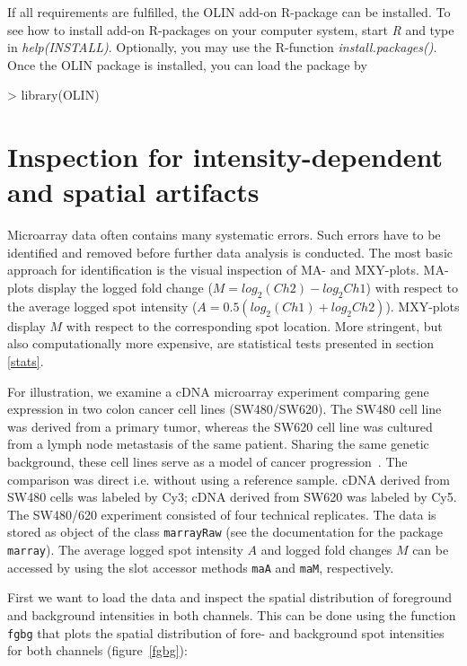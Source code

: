 \documentclass[a4paper,11pt]{article}
\begin{document}
If all requirements are fulfilled, the OLIN add-on R-package can be installed. To see how to install add-on R-packages on your computer system, start \textit{R} and type in \textit{help(INSTALL)}.
Optionally, you may use the R-function \textit{install.packages()}. 
Once the OLIN package is installed, you can load the package by 

\begin{Schunk}
\begin{Sinput}
> library(OLIN)
\end{Sinput}
\end{Schunk}



\section{Inspection for  intensity-dependent and spatial artifacts}
\label{visu}
Microarray data often contains many systematic errors.
 Such errors have to be identified and removed
 before further data analysis is conducted.  The most basic approach for identification 
 is the visual inspection 
of MA- and MXY-plots. MA-plots display the logged fold change 
($M=log_{2}(Ch2) - log_{2}{Ch1}$)
with respect to the average logged spot intensity  ($A=0.5(log_{2}(Ch1) + log_{2}{Ch2})$).
MXY-plots display $M$ with respect to the corresponding spot location. 
More stringent, but also computationally more expensive,  are statistical tests presented in section \ref{stats}. 


For illustration, we examine a cDNA microarray experiment comparing  gene expression in two colon cancer cell lines (SW480/SW620). The SW480 cell line was derived from a primary tumor, whereas 
the SW620 cell line was cultured from a lymph node metastasis of the same patient.
 Sharing the same genetic background, these cell lines serve as a  model
 of cancer progression~\cite{genomeletters}. The comparison was direct i.e. without using a 
reference sample. cDNA derived from SW480 cells was labeled by Cy3; cDNA derived 
from SW620 was labeled by Cy5. The SW480/620 experiment consisted of four 
technical replicates. The data is stored as object of the class \texttt{marrayRaw} (see
the documentation for the package \texttt{marray}). The average logged spot intensity
$A$ and logged fold changes $M$ can be accessed by using   the slot accessor methods \texttt{maA} and \texttt{maM}, respectively.


First we want to load the data and inspect the spatial distribution of foreground and
background intensities in both channels. This can be done using the  function \texttt{fgbg}
that plots the spatial distribution of fore- and background spot intensities for both channels (figure~\ref{fgbg}):
\end{document}

